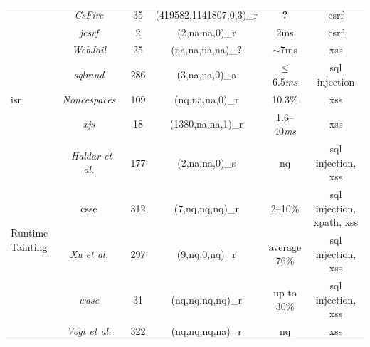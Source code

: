 \documentclass[conference]{IEEEtran}
\newcommand{\tick}{\ding{52}}
\newcommand{\xmark}{\ding{56}}
\begin{document}
\begin{landscape}
\begin{table}
\begin{threeparttable}
\begin{small}
{\begin{tabular}{l|c|c|cc|c}
  &   {\it CsFire}~\cite{DDHPJ10} & 35 & (419582,1141807,0,3)\_r\tnote{3} & {\bf ?} & {\sc csrf} \\
  &   {\it j{\sc csrf}}~\cite{PS11} & 2 & (2,{\sc na},{\sc na},0)\_r & 2ms & {\sc csrf} \\
  &   {\it WebJail}~\cite{VDDPJ11} & 25 & ({\sc na},{\sc na},{\sc na},{\sc na})\_{\bf ?} & $\sim$7ms & {\sc xss} \\
  \hline
  \hline
  \multirow{3}{*}{{\sc isr}}
  &   {\it {\sc sql}rand}~\cite{BK04} & 286 & (3,{\sc na},{\sc na},0)\_a & $\le$6.5{\it ms} & {\sc sql} injection \\
  &   {\it Noncespaces}~\cite{GC09} & 109 & ({\sc nq},{\sc na},{\sc na},0)\_r &  10.3\% & {\sc xss} \\ 
  &   {\it x{\sc js}}~\cite{APKLM10} & 18 & (1380,{\sc na},{\sc na},1)\_r & 1.6--40{\it ms} & {\sc xss} \\
  \hline
  \hline
	\multirow{7}{*}{Runtime Tainting}
  &   {\it Haldar et al.}~\cite{HCF05} & 177 & (2,{\sc na},{\sc na},0)\_s & {\sc nq} & {\sc sql} injection, {\sc xss} \\ 
	&  	{\sc csse}~\cite{PB05} & 312 & (7,{\sc nq},{\sc nq},{\sc nq})\_r & 2--10\% & {\sc sql} injection, {\sc xp}ath, {\sc xss} \\
	&  	{\it Xu et al.}~\cite{XBS06} & 297 & (9,{\sc nq},0,{\sc nq})\_r & average 76\% & {\sc sql} injection, {\sc xss} \\ 
  &  	{\it {\sc wasc}}~\cite{NLC07} & 31 & ({\sc nq},{\sc nq},{\sc nq},{\sc nq})\_r & up to 30\% & {\sc sql} injection, {\sc xss} \\
	&  	{\it Vogt et al.}~\cite{VFJKKV07} & 322 & ({\sc nq},{\sc nq},{\sc nq},{\sc na})\_r & {\sc nq} & {\sc xss} \\

\end{tabular}}
\end{small}
\end{threeparttable}
\end{table}
\end{landscape}
\end{document}
